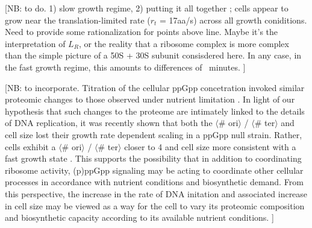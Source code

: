 [NB: to do. 1) slow growth regime, 2) putting it all together ; cells appear to
grow near the translation-limited rate ($r_t$ = 17aa/s) across all growth coniditions. Need
to provide some rationalization for points above line. Maybe it's the interpretation
of $L_R$, or the reality that a ribosome complex is more complex than the simple picture of a 50S + 30S subunit consisdered here. In any case, in the fast growth regime, this amounts to
differences of ~minutes. ]

[NB: to incorporate. Titration of the cellular ppGpp concetration invoked similar proteomic changes
to those observed under nutrient limitation \citep{zhu2019}. In light of our
hypothesis that such changes to the proteome are intimately linked to  the
details of DNA replication, it was recently shown that both the  $\langle$\#
ori$\rangle$ / $\langle$\# ter$\rangle$ and cell size lost their growth rate
dependent scaling in a ppGpp null strain. Rather, cells exhibit a $\langle$\#
ori$\rangle$ / $\langle$\# ter$\rangle$ closer to 4 and cell size more
consistent with a fast growth state \citep{fernandezcoll2020}. This supports the
possibility that in addition  to coordinating ribosome activity, (p)ppGpp
signaling may be acting to coordinate other  cellular processes in accordance
with nutrient conditions and biosynthetic demand. From this  perspective, the
increase in the rate of DNA initation and associated increase in cell  size may
be viewed as a way for the cell to vary its proteomic composition and
biosynthetic  capacity according to its available nutrient conditions. ]



